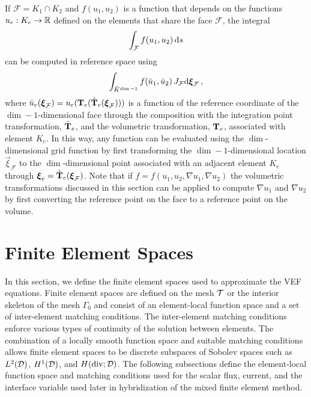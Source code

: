\documentclass[../doc.tex]{subfiles}
\begin{document}
If $\mathcal{F} = K_1 \cap K_2$ and $f(u_1, u_2)$ is a function that depends on the functions $u_e : K_e \rightarrow \mathbb{R}$ defined on the elements that share the face $\mathcal{F}$, the integral  
	\begin{equation}
		\int_\mathcal{F} f(u_1, u_2) \mathop{}\!\mathrm{d} s 
	\end{equation}
can be computed in reference space using 
	\begin{equation}
		\int_{\hat{K}^{\dim-1}} f(\bar{u}_1, \bar{u}_2)\, J_\mathcal{F}\!\mathop{}\!\mathrm{d} \boldsymbol{\xi}_\mathcal{F} \,, 
	\end{equation}
where $\bar{u}_e(\boldsymbol{\xi}_\mathcal{F}) = u_e(\boldsymbol{\mathrm{T}}_e(\hat{\boldsymbol{\mathrm{T}}}_e(\boldsymbol{\xi}_\mathcal{F})))$ is a function of the reference coordinate of the $\dim-1$-dimensional face through the composition with the integration point transformation, $\hat{\boldsymbol{\mathrm{T}}}_e$, and the volumetric transformation, $\boldsymbol{\mathrm{T}}_e$, associated with element $K_e$. In this way, any function can be evaluated using the $\dim$-dimensional grid function by first transforming the $\dim-1$-dimensional location $\vec{\xi}_\mathcal{F}$ to the $\dim$-dimensional point associated with an adjacent element $K_e$ through $\boldsymbol{\xi}_e = \hat{\boldsymbol{\mathrm{T}}}_e(\boldsymbol{\xi}_\mathcal{F})$. Note that if $f = f(u_1, u_2, \nabla u_1, \nabla u_2)$ the volumetric transformations discussed in this section can be applied to compute $\nabla u_1$ and $\nabla u_2$ by first converting the reference point on the face to a reference point on the volume. 

\section{Finite Element Spaces} \label{fem_sec:fes}
In this section, we define the finite element spaces used to approximate the VEF equations. Finite element spaces are defined on the mesh $\mathcal{T}$ or the interior skeleton of the mesh $\Gamma_0$ and consist of an element-local function space and a set of inter-element matching conditions. 
The inter-element matching conditions enforce various types of continuity of the solution between elements. The combination of a locally smooth function space and suitable matching conditions allows finite element spaces to be discrete subspaces of Sobolev spaces such as $L^2(\mathcal{D})$, $H^1(\mathcal{D})$, and $H(\operatorname{div};\mathcal{D})$. The following subsections define the element-local function space and matching conditions used for the scalar flux, current, and the interface variable used later in hybridization of the mixed finite element method. 
\end{document}
